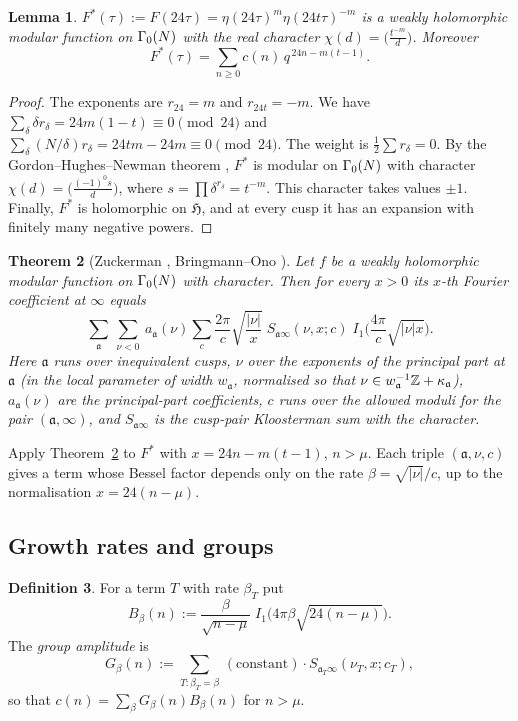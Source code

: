 \documentclass[11pt]{amsart}
\newtheorem{theorem}{Theorem}[section]\newtheorem{lemma}[theorem]{Lemma}\newtheorem{proposition}[theorem]{Proposition}\newtheorem{corollary}[theorem]{Corollary}
\theoremstyle{definition}\newtheorem{definition}[theorem]{Definition}
\theoremstyle{remark}\newtheorem{remark}[theorem]{Remark}
\begin{document}
\begin{lemma}\label{lem:ghn}
$F^\ast(\tau):=F(24\tau)=\eta(24\tau)^m\eta(24t\tau)^{-m}$ is a weakly holomorphic modular function on $\Gamma_0(N)$ with the real character $\chi(d)=\big(\tfrac{t^{-m}}{d}\big)$. Moreover
\[
F^\ast(\tau)=\sum_{n\ge0}c(n)\,q^{\,24n-m(t-1)} .
\]
\end{lemma}
\begin{proof}
The exponents are $r_{24}=m$ and $r_{24t}=-m$. We have $\sum_\delta\delta r_\delta=24m(1-t)\equiv0\pmod{24}$ and $\sum_\delta (N/\delta)r_\delta=24tm-24m\equiv0\pmod{24}$. The weight is $\frac12\sum r_\delta=0$. By the Gordon--Hughes--Newman theorem \cite[Thm.~1.64]{O}, $F^\ast$ is modular on $\Gamma_0(N)$ with character $\chi(d)=\big(\frac{(-1)^0s}{d}\big)$, where $s=\prod\delta^{r_\delta}=t^{-m}$. This character takes values $\pm1$. Finally, $F^\ast$ is holomorphic on $\mathfrak H$, and at every cusp it has an expansion with finitely many negative powers.
\end{proof}

\begin{theorem}[Zuckerman \cite{Z}, Bringmann--Ono \cite{BO}]\label{thm:zuck}
Let $f$ be a weakly holomorphic modular function on $\Gamma_0(N)$ with character. Then for every $x>0$ its $x$-th Fourier coefficient at $\infty$ equals
\[
\sum_{\mathfrak a}\ \sum_{\nu<0}\ a_{\mathfrak a}(\nu)\sum_{c}\frac{2\pi}{c}\sqrt{\frac{|\nu|}{x}}\;S_{\mathfrak a\infty}(\nu,x;c)\;I_1\!\Big(\frac{4\pi}{c}\sqrt{|\nu|x}\Big).
\]
Here $\mathfrak a$ runs over inequivalent cusps, $\nu$ over the exponents of the principal part at $\mathfrak a$ (in the local parameter of width $w_{\mathfrak a}$, normalised so that $\nu\in w_{\mathfrak a}^{-1}\mathbb Z+\kappa_{\mathfrak a}$), $a_{\mathfrak a}(\nu)$ are the principal-part coefficients, $c$ runs over the allowed moduli for the pair $(\mathfrak a,\infty)$, and $S_{\mathfrak a\infty}$ is the cusp-pair Kloosterman sum with the character.
\end{theorem}

Apply Theorem~\ref{thm:zuck} to $F^\ast$ with $x=24n-m(t-1)$, $n>\mu$. Each triple $(\mathfrak a,\nu,c)$ gives a term whose Bessel factor depends only on the rate $\beta=\sqrt{|\nu|}/c$, up to the normalisation $x=24(n-\mu)$.

\subsection{Growth rates and groups}
\begin{definition}
For a term $T$ with rate $\beta_T$ put
\[
B_\beta(n):=\frac{\beta}{\sqrt{n-\mu}}\;I_1\big(4\pi\beta\sqrt{24(n-\mu)}\big).
\]
The \emph{group amplitude} is
\[
G_\beta(n):=\sum_{T:\beta_T=\beta}\,(\text{constant})\cdot S_{\mathfrak a_T\infty}(\nu_T,x;c_T),
\]
so that $c(n)=\sum_\beta G_\beta(n)B_\beta(n)$ for $n>\mu$.
\end{definition}
\end{document}
